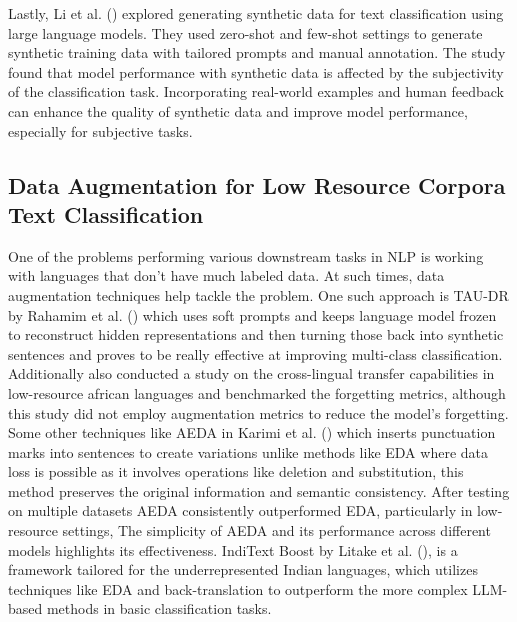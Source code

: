Lastly, Li et al. (\citeyear{li2023syntheticdatagenerationlarge}) explored generating synthetic data for text classification using large language models. They used zero-shot and few-shot settings to generate synthetic training data with tailored prompts and manual annotation. The study found that model performance with synthetic data is affected by the subjectivity of the classification task. Incorporating real-world examples and human feedback can enhance the quality of synthetic data and improve model performance, especially for subjective tasks.

\subsection{Data Augmentation for Low Resource Corpora Text Classification}
One of the problems performing various downstream tasks in NLP is working with languages that don't have much labeled data. At such times, data augmentation techniques help tackle the problem. One such approach is TAU-DR by Rahamim
et al. (\citeyear{rahamim-etal-2023-text}) which uses soft prompts and keeps language model frozen to reconstruct hidden representations and then turning those back into synthetic sentences and proves to be really effective at improving multi-class classification. Additionally \cite{thangaraj2024crosslingualtransfermultilingualmodels} also conducted a study on the cross-lingual transfer capabilities in low-resource african languages and benchmarked the forgetting metrics, although this study did not employ augmentation metrics to reduce the model's forgetting.
Some other techniques like AEDA in Karimi et al. (\citeyear{karimi-etal-2021-aeda-easier}) which inserts punctuation marks into sentences to create variations unlike methods like EDA where data loss is possible as it involves operations like deletion and substitution, this method preserves the original information and semantic consistency. After testing on multiple datasets AEDA consistently outperformed EDA, particularly in low-resource settings, The simplicity of AEDA and its performance across different models highlights its effectiveness. IndiText Boost by Litake et al. (\citeyear{Litake2024IndiTextBT}), is a framework tailored for the underrepresented Indian languages, which utilizes techniques like EDA and back-translation to outperform the more complex LLM-based methods in basic classification tasks.
 
